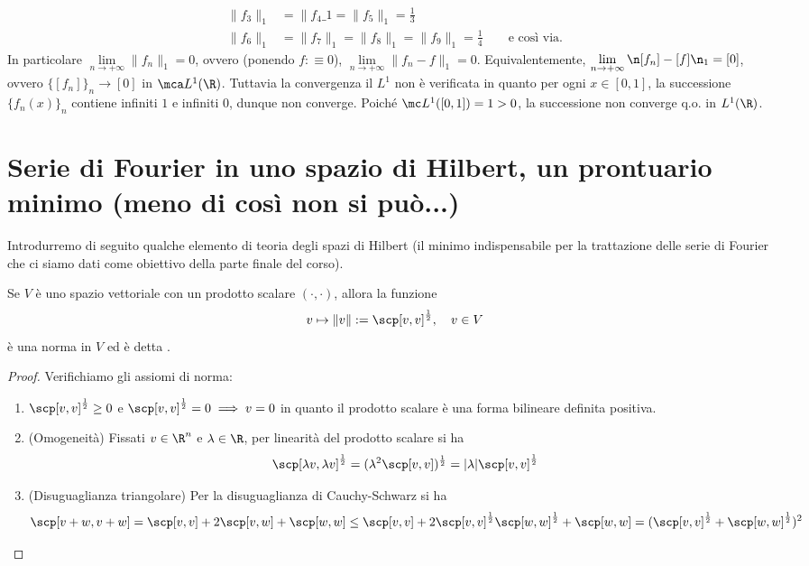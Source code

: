 \begin{ex}[Tendina]
\begin{align*}
        \|f_3\|_1 &= \|f_4\_1 = \|f_5\|_1 = \frac{1}{3}\\
        \|f_6\|_1 &= \|f_7\|_1 = \|f_8\|_1 = \|f_9\|_1  = \frac{1}{4} \qquad \text{e così via.}
    \end{align*}
    In particolare $\lim\limits_{n\to +\infty}\|f_n\|_1 = 0$, ovvero (ponendo $f:\equiv 0$), $\lim\limits_{n\to +\infty}\|f_n-f\|_1 = 0$. Equivalentemente,  $\lim\limits_{n\to +\infty}\n [f_n]-[f]\n_1 = [0]$, ovvero $\{[f_n]\}_{n}\rightarrow [0]$ in $\mca L^1(\R)$. Tuttavia la convergenza il $L^1$ non è verificata in quanto per ogni $x\in [0,1]$, la successione $\{f_n(x)\}_n$ contiene infiniti $1$ e infiniti $0$, dunque non converge. Poiché $\mc L^1([0,1])=1>0$, la successione non converge q.o. in $L^1(\R)$. 
\end{ex}

\section[Serie di Fourier in uno spazio di Hilbert]{Serie di Fourier in uno spazio di Hilbert, un prontuario minimo (meno di così non si può...)}
Introdurremo di seguito qualche elemento di teoria degli spazi di Hilbert (il minimo indispensabile per la trattazione delle serie di Fourier che ci siamo dati come obiettivo della parte finale del corso).

\begin{proposition}[$*$]\label{prop: 3.2}
    Se $V$ è uno spazio vettoriale con un prodotto scalare $(\cdot, \cdot)$, allora la funzione
    \[
    v \mapsto\|v\|:=\scp[v, v]^\frac{1}{2}, \quad v \in V
    \]
    è una norma in $V$ ed è detta .
\end{proposition}
\begin{proof}Verifichiamo gli assiomi di norma:
    \begin{enumerate}[label=$\roman*)$]
        \item $\scp[v,v]^{\frac{1}{2}}\geq 0$ e $\scp[v,v]^{\frac{1}{2}}= 0\implies v=0$ in quanto il prodotto scalare è una forma bilineare definita positiva.
        \item (Omogeneità) Fissati $v\in \R^n$ e $\lambda \in \R$, per linearità del prodotto scalare si ha 
        \[\scp[\lambda v,\lambda v]^{\frac{1}{2}} = (\lambda ^2\scp[v,v])^{\frac{1}{2}} = |\lambda|\scp[v,v]^{\frac{1}{2}}\]
        \item (Disuguaglianza triangolare) Per la disuguaglianza di Cauchy-Schwarz si ha
        \[\scp[v+w,v+w] = \scp[v,v] + 2\scp[v,w] + \scp[w,w] \leq \scp[v,v] + 2\scp[v,v]^{\frac{1}{2}}\scp[w,w]^{\frac{1}{2}} + \scp[w,w] = (\scp[v,v]^{\frac{1}{2}} + \scp[w,w]^{\frac{1}{2}})^2\qedhere\]
    \end{enumerate}
\end{proof}

